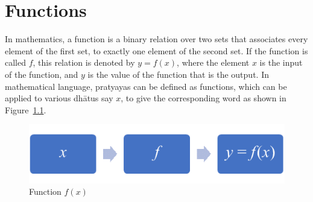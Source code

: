 \chapter{Functions}
\label{sec:4}
In mathematics, a function is a binary relation over two sets that associates every element of the first set, to exactly one element of the second set.
If the function is called $f$, this relation is denoted by $y = f (x)$, where the element $x$ is the input of the function, and $y$ is the value of the function that is the output.
In mathematical language, pratyayas can be defined as functions, which	can be applied to various dhātus say $x$, to give the corresponding word as shown in Figure~\ref{fig:x}.
\begin{figure}[!h]
	\centering
	\includegraphics[width=1.0\textwidth]{function.png}
	\hspace{1mm}
	\caption{Function $f(x)$} 
	\label{fig:x}
\end{figure}

